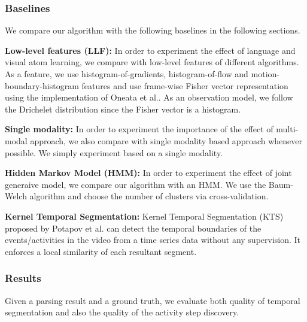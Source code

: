 \subsubsection{Baselines}
We compare our algorithm with the following baselines in the following sections.

\noindent\textbf{Low-level features (LLF):}
In order to experiment the effect of language and visual atom learning, we compare with low-level features of different algorithms. As a feature, we use histogram-of-gradients, histogram-of-flow and motion-boundary-histogram features and use frame-wise Fisher vector representation using the implementation of Oneata et al.\cite{fastLaptev}. As an observation model, we follow the Drichelet distribution since the Fisher vector is a histogram.

\noindent\textbf{Single modality:}
In order to experiment the importance of the effect of multi-modal approach, we also compare with single modality based approach whenever possible. We simply experiment based on a single modality.

\noindent\textbf{Hidden Markov Model (HMM):}
In order to experiment the effect of joint generaive model, we compare our algorithm with an HMM. We use the Baum-Welch algorithm\cite{rabiner} and choose the number of clusters via cross-validation.


\noindent\textbf{Kernel Temporal Segmentation\cite{potapov2014category}:}
Kernel Temporal Segmentation (KTS) proposed by Potapov et al.\cite{potapov2014category} can detect the temporal boundaries of the events/activities in the video from a time series data without any supervision. It enforces a local similarity of each resultant segment.

\subsubsection{Results}
Given a parsing result and a ground truth, we evaluate both quality of temporal segmentation and also the quality of the activity step discovery. 

